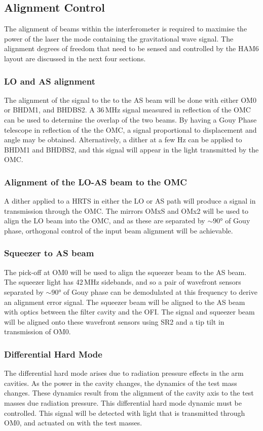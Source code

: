 \subsection{Alignment Control}
The alignment of beams within the interferometer is required to maximise the power of the laser the mode containing the gravitational wave signal. The alignment degrees of freedom that need to be sensed and controlled by the HAM6 layout are discussed in the next four sections.
\subsubsection{LO and AS alignment}
The alignment of the signal to the to the AS beam will be done with either OM0 or BHDM1, and BHDBS2. A 36\,MHz signal measured in reflection of the OMC can be used to determine the overlap of the two beams. By having a Gouy Phase telescope in reflection of the the OMC, a signal proportional to displacement and angle may be obtained. Alternatively, a dither at a few Hz can be applied to BHDM1 and BHDBS2, and this signal will appear in the light transmitted by the OMC.
\subsubsection{Alignment of the LO-AS beam to the OMC}
A dither applied to a HRTS in either the LO or AS path will produce a signal in transmission through the OMC. The mirrors OMxS and OMx2 will be used to align the LO beam into the OMC, and as these are separated by $\sim90\si{\degree}$ of Gouy phase, orthogonal control of the input beam alignment will be achievable. 
\subsubsection{Squeezer to AS beam}
The pick-off at OM0 will be used to align the squeezer beam to the AS beam. The squeezer light has 42\,MHz sidebands, and so a pair of wavefront sensors separated by $\sim90\si{\degree}$ of Gouy phase can be demodulated at this frequency to derive an alignment error signal. The squeezer beam will be aligned to the AS beam with optics between the filter cavity and the OFI. The signal and squeezer beam will be aligned onto these wavefront sensors using SR2 and a tip tilt in transmission of OM0.
\subsubsection{Differential Hard Mode}
The differential hard mode arises due to radiation pressure effects in the arm cavities. As the power in the cavity changes, the dynamics of the test mass changes. These dynamics result from the alignment of the cavity axis to the test masses due radiation pressure. This differential hard mode dynamic must be controlled. This signal will be detected with light that is transmitted through OM0, and actuated on with the test masses.